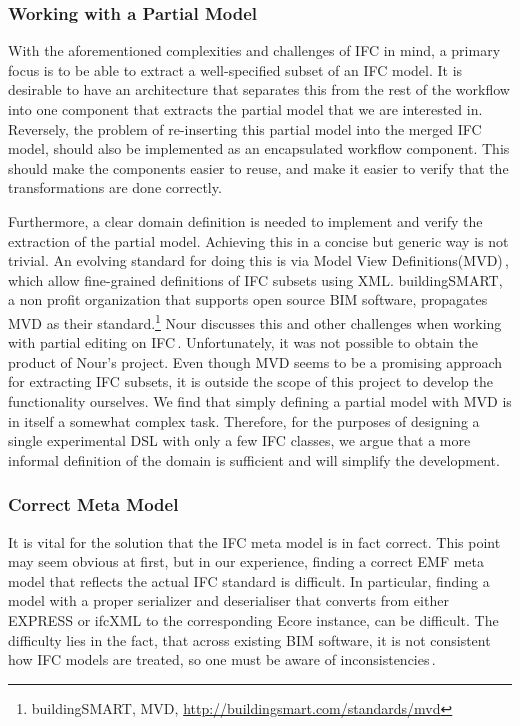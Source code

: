 \subsubsection{Working with a Partial Model}
With the aforementioned complexities and challenges of IFC in mind, a primary focus is to be able to extract a well-specified subset of an IFC model. It is desirable to have an architecture that separates this from the rest of the workflow into one component that extracts the partial model that we are interested in. Reversely, the problem of re-inserting this partial model into the merged IFC model, should also be implemented as an encapsulated workflow component. This should make the components easier to reuse, and make it easier to verify that the transformations are done correctly.

Furthermore, a clear domain definition is needed to implement and verify the extraction of the partial model. Achieving this in a concise but generic way is not trivial. An evolving standard for doing this is via Model View Definitions(MVD)\,\cite{nour08}, which allow fine-grained definitions of IFC subsets using XML. buildingSMART, a non profit organization that supports open source BIM software, propagates MVD as their standard.\footnote{buildingSMART, MVD, \url{http://buildingsmart.com/standards/mvd}} Nour discusses this and other challenges when working with partial editing on IFC\,\cite{nour08}.  Unfortunately, it was not possible to obtain the product of Nour's project. Even though MVD seems to be a promising approach for extracting IFC subsets, it is outside the scope of this project to develop the functionality ourselves. We find that simply defining a partial model with MVD is in itself a somewhat complex task. Therefore, for the purposes of designing a single experimental DSL with only a few IFC classes, we argue that a more informal definition of the domain is sufficient and will simplify the development.

\subsubsection{Correct Meta Model}
It is vital for the solution that the IFC meta model is in fact correct. This point may seem obvious at first, but in our experience, finding a correct EMF meta model that reflects the actual IFC standard is difficult. In particular, finding a model with a proper serializer and deserialiser that converts from either EXPRESS or ifcXML to the corresponding Ecore instance, can be difficult. The difficulty lies in the fact, that across existing BIM software, it is not consistent how IFC models are treated, so one must be aware of inconsistencies\,\cite[p. 4]{quteprints37725}.

